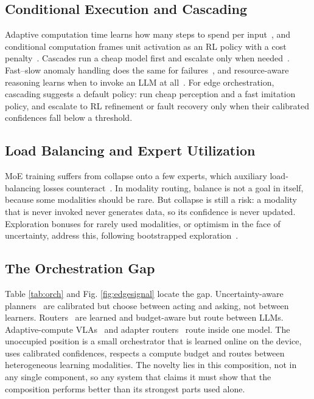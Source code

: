 \documentclass[journal]{IEEEtran}
\begin{document}
\subsection{Conditional Execution and Cascading}\label{sec:cascade}
Adaptive computation time learns how many steps to spend per input~\cite{Graves2016}, and conditional computation frames unit activation as an RL policy with a cost penalty~\cite{Bengio2015}. Cascades run a cheap model first and escalate only when needed~\cite{Chen2024,Aggarwal2024}. Fast--slow anomaly handling does the same for failures~\cite{Sinha2024}, and resource-aware reasoning learns when to invoke an LLM at all~\cite{Liu2026}. For edge orchestration, cascading suggests a default policy: run cheap perception and a fast imitation policy, and escalate to RL refinement or fault recovery only when their calibrated confidences fall below a threshold.


\subsection{Load Balancing and Expert Utilization}\label{sec:balance}
MoE training suffers from collapse onto a few experts, which auxiliary load-balancing losses counteract~\cite{Shazeer2017,Fedus2022}. In modality routing, balance is not a goal in itself, because some modalities should be rare. But collapse is still a risk: a modality that is never invoked never generates data, so its confidence is never updated. Exploration bonuses for rarely used modalities, or optimism in the face of uncertainty, address this, following bootstrapped exploration~\cite{Osband2016}.


\subsection{The Orchestration Gap}\label{sec:position}
Table \ref{tab:orch} and Fig. \ref{fig:edgesignal} locate the gap. Uncertainty-aware planners~\cite{Ren2023,Yuan2026} are calibrated but choose between acting and asking, not between learners. Routers~\cite{Ong2025,Ding2024} are learned and budget-aware but route between LLMs. Adaptive-compute VLAs~\cite{Yue2024,Zhang2026b} and adapter routers~\cite{Romer2026b,Zhu2025} route inside one model. The unoccupied position is a small orchestrator that is learned online on the device, uses calibrated confidences, respects a compute budget and routes between heterogeneous learning modalities. The novelty lies in this composition, not in any single component, so any system that claims it must show that the composition performs better than its strongest parts used alone.
\end{document}
